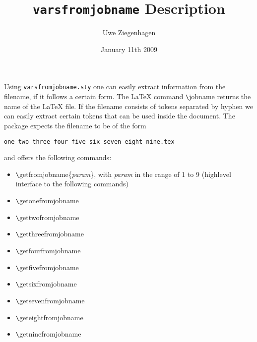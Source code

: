 \documentclass{article}
\date{January 11th 2009}
\author{Uwe Ziegenhagen}
\title{\texttt{varsfromjobname} Description}
\begin{document}
\maketitle

\noindent Using \texttt{varsfromjobname.sty} one can easily extract information from the filename, if it follows a certain form. The LaTeX command \verb|\|jobname returns the name of the LaTeX file. If the filename consists of tokens separated by hyphen we can easily extract certain tokens that can be used inside the document. The package expects the filename to be of the form 

\noindent\texttt{one-two-three-four-five-six-seven-eight-nine.tex} 

\noindent and offers the following commands:

\begin{itemize}
	\item \verb|\|getfromjobname\{\textit{param}\}, with \textit{param} in the range of 1 to 9 (highlevel interface to the following commands)
	\item \verb|\|getonefromjobname
	\item \verb|\|gettwofromjobname
	\item \verb|\|getthreefromjobname
	\item \verb|\|getfourfromjobname
	\item \verb|\|getfivefromjobname
	\item \verb|\|getsixfromjobname
	\item \verb|\|getsevenfromjobname
	\item \verb|\|geteightfromjobname
	\item \verb|\|getninefromjobname	
\end{itemize}
\end{document}
